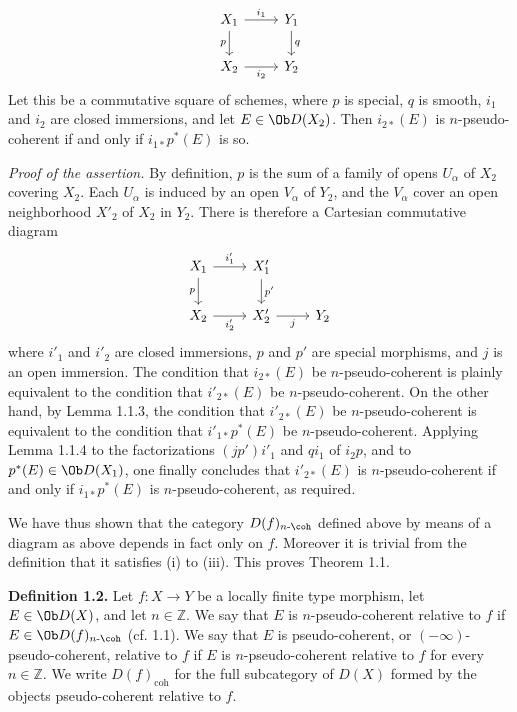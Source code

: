 \[
\begin{tikzcd}
X_1 \arrow[r,"i_1"] \arrow[d,"p"'] & Y_1 \arrow[d,"q"]\\
X_2 \arrow[r,"i_2"'] & Y_2
\end{tikzcd}
\]
Let this be a commutative square of schemes, where \(p\) is special, \(q\) is smooth, \(i_1\) and \(i_2\) are closed immersions, and let \(E\in \Ob D(X_2)\). Then \(i_{2*}(E)\) is \(n\)-pseudo-coherent if and only if \(i_{1*}p^*(E)\) is so.

\emph{Proof of the assertion.} By definition, \(p\) is the sum of a family of opens \(U_\alpha\) of \(X_2\) covering \(X_2\). Each \(U_\alpha\) is induced by an open \(V_\alpha\) of \(Y_2\), and the \(V_\alpha\) cover an open neighborhood \(X'_2\) of \(X_2\) in \(Y_2\). There is therefore a Cartesian commutative diagram
\[
\begin{tikzcd}
X_1 \arrow[r,"i'_1"] \arrow[d,"p"'] & X'_1 \arrow[d,"p'"]\\
X_2 \arrow[r,"i'_2"'] & X'_2 \arrow[r,"j"'] & Y_2
\end{tikzcd}
\]
where \(i'_1\) and \(i'_2\) are closed immersions, \(p\) and \(p'\) are special morphisms, and \(j\) is an open immersion. The condition that \(i_{2*}(E)\) be \(n\)-pseudo-coherent is plainly equivalent to the condition that \(i'_{2*}(E)\) be \(n\)-pseudo-coherent. On the other hand, by Lemma 1.1.3, the condition that \(i'_{2*}(E)\) be \(n\)-pseudo-coherent is equivalent to the condition that \(i'_{1*}p^*(E)\) be \(n\)-pseudo-coherent. Applying Lemma 1.1.4 to the factorizations \((jp')i'_1\) and \(qi_1\) of \(i_2p\), and to \(p^*(E)\in \Ob D(X_1)\), one finally concludes that \(i'_{2*}(E)\) is \(n\)-pseudo-coherent if and only if \(i_{1*}p^*(E)\) is \(n\)-pseudo-coherent, as required.

We have thus shown that the category \(D(f)_{n\text{-}\coh}\) defined above by means of a diagram as above depends in fact only on \(f\). Moreover it is trivial from the definition that it satisfies (i) to (iii). This proves Theorem 1.1.

\textbf{Definition 1.2.} Let \(f:X\to Y\) be a locally finite type morphism, let \(E\in \Ob D(X)\), and let \(n\in\mathbb Z\). We say that \(E\) is \(n\)-pseudo-coherent relative to \(f\) if \(E\in \Ob D(f)_{n\text{-}\coh}\) (cf. 1.1). We say that \(E\) is pseudo-coherent, or \((-\infty)\)-pseudo-coherent, relative to \(f\) if \(E\) is \(n\)-pseudo-coherent relative to \(f\) for every \(n\in\mathbb Z\). We write \(D(f)_{\mathrm{coh}}\) for the full subcategory of \(D(X)\) formed by the objects pseudo-coherent relative to \(f\).

